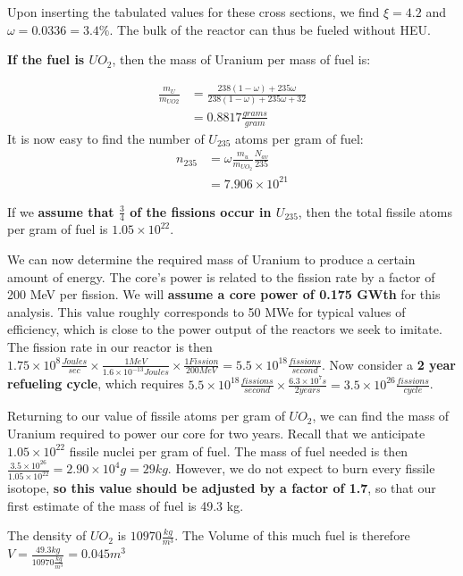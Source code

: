 \documentclass[12pt]{article}
\begin{document}
Upon inserting the tabulated values for these cross sections, we find $\xi = 4.2$ and $\omega = 0.0336 = 3.4 \% $. The bulk of the reactor can thus be fueled without HEU.

\textbf{If the fuel is $UO_2$}, then the mass of Uranium per mass of fuel is:

\begin{align}
\frac{m_U}{m_{UO2}} &= \frac{238 (1 - \omega) + 235 \omega}{238 (1 - \omega) + 235 \omega + 32} \\
 &= 0.8817 \frac{grams}{gram}
\end{align}
It is now easy to find the number of $U_{235}$ atoms per gram of fuel:
\begin{align}
n_{235} &= \omega \frac{m_u}{m_{UO_2}} \frac{N_{av}}{235} \\
 &= 7.906 \times 10^{21}
\end{align}

If we \textbf{assume that $\frac{3}{4}$ of the fissions occur in $U_{235}$}, then the total fissile atoms per gram of fuel is $1.05 \times 10^{22}$. 

We can now determine the required mass of Uranium to produce a certain amount of energy. The core's power is related to the fission rate by a factor of 200 MeV per fission. We will \textbf{assume a core power of 0.175 GWth} for this analysis. This value roughly corresponds to 50 MWe for typical values of efficiency, which is close to the power output of the reactors we seek to imitate. The fission rate in our reactor is then $1.75 \times 10^8 \frac{Joules}{sec} \times \frac{1 MeV}{1.6 \times 10^{-13} Joules} \times \frac{1 Fission}{200 MeV} = 5.5 \times 10^{18} \frac{fissions}{second}$. Now consider a \textbf{2 year refueling cycle}, which requires $5.5 \times 10^{18} \frac{fissions}{second} \times \frac{6.3 \times 10^7 s}{2 years} = 3.5 \times 10^{26} \frac{fissions}{cycle}$.

Returning to our value of fissile atoms per gram of $UO_2$, we can find the mass of Uranium required to power our core for two years. Recall that we anticipate $1.05 \times 10^{22}$ fissile nuclei per gram of fuel. The mass of fuel needed is then $\frac{3.5 \times 10 ^{26}}{1.05 \times 10^{22}} = 2.90 \times 10^{4} g = 29 kg$. However, we do not expect to burn every fissile isotope, \textbf{so this value should be adjusted by a factor of 1.7}, so that our first estimate of the mass of fuel is 49.3 kg. 

The density of $UO_2$ is $10970 \frac{kg}{m^3}$. The Volume of this much fuel is therefore $V = \frac{49.3 kg}{10970 \frac{kg}{m^3}} =  0.045 m ^ 3 $
\end{document}
